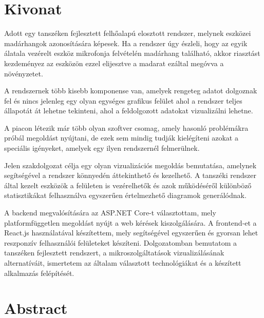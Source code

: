 \setcounter{page}{1}

\selecthungarian

\chapter*{Kivonat}

Adott egy tanszéken fejlesztett felhőalapú elosztott rendszer, melynek eszközei madárhangok azonosítására képesek.
Ha a rendszer úgy észleli, hogy az egyik álatala vezérelt eszköz mikrofonja felvételén madárhang található,
akkor riasztást kezdeményez az eszközön ezzel elijesztve a madarat ezáltal megóvva a növényzetet.

A rendszernek több kisebb komponense van, amelyek rengeteg adatot dolgoznak fel és nincs jelenleg egy olyan egységes grafikus felület ahol a rendszer teljes állapotát
át lehetne tekinteni, ahol a feldolgozott adatokat vizualizálni lehetne.

A piacon létezik már több olyan szoftver csomag, amely hasonló problémákra próbál megoldást nyújtani, de ezek sem mindig
tudják kielégíteni azokat a speciális igényeket, amelyek egy ilyen rendszernél felmerülnek.

Jelen szakdolgozat célja egy olyan vizualizációs megoldás bemutatása, amelynek segítségével a rendszer könnyedén áttekinthető
és kezelhető. A tanszéki rendszer által kezelt eszközök a felületen is vezérelhetők 
és azok működéséről különböző statisztikákat felhasználva egyszerűen értelmezhető diagramok generálódnak.

A backend megvalósítására az ASP.NET Core-t választottam, mely platformfüggetlen megoldást nyújt a web kérések kiszolgálására.
A frontend-et a React.js használatával készítettem, mely segítségével egyszerűen és gyorsan lehet reszponzív felhasználói felületeket készíteni.
Dolgozatomban bemutatom a tanszéken fejlesztett rendszert, a mikroszolgáltatások vizualizálásának alternatíváit,
ismertetem az általam választott technológiákat és a készített alkalmazás felépítését.

\vfill
\selectenglish


\chapter*{Abstract}

